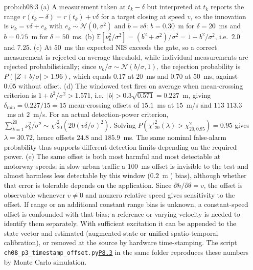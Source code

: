 \documentclass[graybox,envcountchap]{style/SNmono}
\newcommand{\repopath}[1]{\texttt{#1}}
\providecommand{\DIFadd}[1]{{\protect\color{blue} #1}} %
\providecommand{\DIFdel}[1]{{\protect\color{red} #1}} %
\providecommand{\DIFaddbegin}{} %
\providecommand{\DIFaddend}{} %
\providecommand{\DIFdelbegin}{} %
\providecommand{\DIFdelend}{} %
\DeclareRobustCommand{\RtwoDel}[1]{{\color{red}%
  \renewcommand{\DIFadd}[1]{##1}\renewcommand{\DIFdel}[1]{##1}%
  #1}}
\DeclareRobustCommand{\RtwoAdd}[1]{{\color{blue}#1}}
\DeclareRobustCommand{\codeentry}[1]{\hyperref[code:#1]{\texttt{#1}}}
\begin{document}
\begin{sol}{prob:ch08:3}
(a) A measurement taken at $t_k-\delta$ but interpreted at $t_k$ reports the range $r(t_k-\delta)=r(t_k)+v\delta$ for a target closing at speed $v$, so the innovation is $\nu_k=v\delta+e_k$ with $e_k\sim\mathcal{N}(0,\sigma^2)$ and $b=v\delta$: $b=0.30$~m for $\delta=20$~ms and $b=0.75$~m for $\delta=50$~ms. (b) $\mathbb{E}[\nu_k^2/\sigma^2]=(b^2+\sigma^2)/\sigma^2=1+b^2/\sigma^2$, i.e.\ $2.0$ and $7.25$. (c) At $50$~ms the expected NIS exceeds the \DIFdelbegin \DIFdel{gate, so a correct measurement is rejected on average}\DIFdelend \DIFaddbegin \DIFadd{threshold, while individual measurements are rejected probabilistically}\DIFaddend ; since $\nu_k/\sigma\sim\mathcal{N}(b/\sigma,1)$, the rejection probability is $P(\lvert Z+b/\sigma\rvert>1.96)$, which equals $0.17$ at $20$~ms and $0.70$ at $50$~ms, against $0.05$ without offset. (d) The \DIFdelbegin \DIFdel{windowed test fires on average when }\DIFdelend \DIFaddbegin \DIFadd{mean-crossing criterion is }\DIFaddend $1+b^2/\sigma^2>1.571$, i.e.\ $\lvert b\rvert>0.3\sqrt{0.571}=0.227$~m, giving \DIFdelbegin \DIFdel{$\delta_{\min}=0.227/15=15$}\DIFdelend \DIFaddbegin \DIFadd{mean-crossing offsets of $15.1$}\DIFaddend ~ms at $15$~m/s and \DIFdelbegin \DIFdel{$113$}\DIFdelend \DIFaddbegin \DIFadd{$113.3$}\DIFaddend ~ms at $2$~m/s. \DIFaddbegin \DIFadd{For an actual detection-power criterion, $\sum_{k=1}^{20}\nu_k^2/\sigma^2\sim\chi'^2_{20}(20(v\delta/\sigma)^2)$. Solving $P(\chi'^2_{20}(\lambda)>\chi^2_{20,0.95})=0.95$ gives $\lambda=30.72$, hence offsets $24.8$ and $185.9$~ms. The same nominal false-alarm probability thus supports different detection limits depending on the required power. }\DIFaddend (e) The same offset is both most harmful and most detectable at motorway speeds; in slow urban traffic a $100$~ms offset is \DIFdelbegin \DIFdel{invisible to the test and almost harmless }\DIFdelend \DIFaddbegin \DIFadd{less detectable by this window }\DIFaddend ($0.2$~m \DIFdelbegin \DIFdel{)}\DIFdelend \DIFaddbegin \DIFadd{bias), although whether that error is tolerable depends on the application}\DIFaddend . Since $\partial h/\partial\delta=v$, \DIFdelbegin \DIFdel{the offset is observable whenever $v\neq0$ and }\DIFdelend \DIFaddbegin \DIFadd{nonzero relative speed gives sensitivity to the offset. If range or an additional constant range bias is unknown, a constant-speed offset is confounded with that bias; a reference or varying velocity is needed to identify them separately. With sufficient excitation it }\DIFaddend can be appended to the state vector and estimated (augmented-state or unified spatio-temporal calibration), or removed at the source by hardware time-stamping. The script \RtwoDel{\repopath{ch08\_\allowbreak p3\_\allowbreak timestamp\_\allowbreak offset.py}}\RtwoAdd{\codeentry{P8.3}} in the same folder reproduces these numbers by Monte Carlo simulation.
\end{sol}
\end{document}

